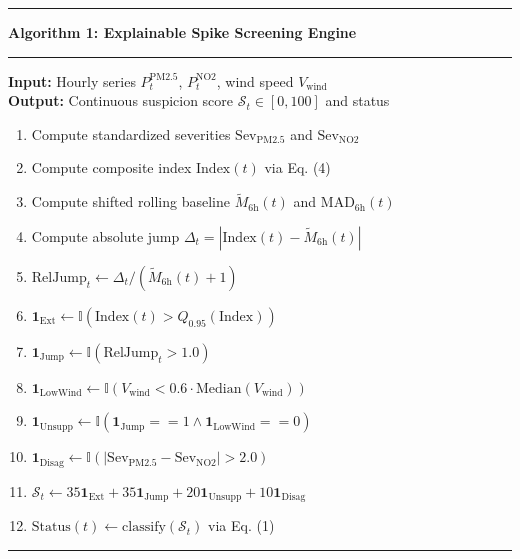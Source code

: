 \documentclass[twoside]{article}
\begin{document}
\vspace{0.25em}
\hrule
\vspace{0.25em}
\noindent\textbf{Algorithm 1: Explainable Spike Screening Engine}
\vspace{0.25em}
\hrule
\vspace{0.3em}
\noindent\textbf{Input:} Hourly series $P_t^{\mathrm{PM2.5}}$, $P_t^{\mathrm{NO2}}$, wind speed $V_{\mathrm{wind}}$\\
\textbf{Output:} Continuous suspicion score $\mathcal{S}_t \in [0, 100]$ and status
\begin{enumerate}
  \setlength{\itemsep}{0.5pt}
  \setlength{\parskip}{0pt}
  \item Compute standardized severities $\mathrm{Sev}_{\mathrm{PM2.5}}$ and $\mathrm{Sev}_{\mathrm{NO2}}$
  \item Compute composite index $\mathrm{Index}(t)$ via Eq. (4)
  \item Compute shifted rolling baseline $\tilde{M}_{6\mathrm{h}}(t)$ and $\mathrm{MAD}_{6\mathrm{h}}(t)$
  \item Compute absolute jump $\Delta_t = |\mathrm{Index}(t) - \tilde{M}_{6\mathrm{h}}(t)|$
  \item $\mathrm{RelJump}_t \leftarrow \Delta_t / (\tilde{M}_{6\mathrm{h}}(t) + 1)$
  \item $\mathbf{1}_{\mathrm{Ext}} \leftarrow \mathbb{I}(\mathrm{Index}(t) > Q_{0.95}(\mathrm{Index}))$
  \item $\mathbf{1}_{\mathrm{Jump}} \leftarrow \mathbb{I}(\mathrm{RelJump}_t > 1.0)$
  \item $\mathbf{1}_{\mathrm{LowWind}} \leftarrow \mathbb{I}(V_{\mathrm{wind}} < 0.6 \cdot \mathrm{Median}(V_{\mathrm{wind}}))$
  \item $\mathbf{1}_{\mathrm{Unsupp}} \leftarrow \mathbb{I}(\mathbf{1}_{\mathrm{Jump}} == 1 \land \mathbf{1}_{\mathrm{LowWind}} == 0)$
  \item $\mathbf{1}_{\mathrm{Disag}} \leftarrow \mathbb{I}(|\mathrm{Sev}_{\mathrm{PM2.5}} - \mathrm{Sev}_{\mathrm{NO2}}| > 2.0)$
  \item $\mathcal{S}_t \leftarrow 35 \mathbf{1}_{\mathrm{Ext}} + 35 \mathbf{1}_{\mathrm{Jump}} + 20 \mathbf{1}_{\mathrm{Unsupp}} + 10 \mathbf{1}_{\mathrm{Disag}}$
  \item $\mathrm{Status}(t) \leftarrow \text{classify}(\mathcal{S}_t)$ via Eq. (1)
\end{enumerate}
\vspace{0.2em}
\hrule
\vspace{0.35em}
\end{document}
